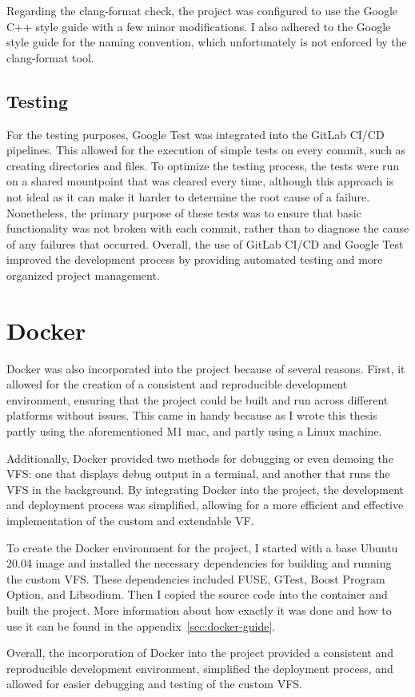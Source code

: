 Regarding the clang-format check, the project was configured to use the Google C++ style guide\cite{google_cpp_style_guide} with a few minor modifications.
I also adhered to the Google style guide for the naming convention, which unfortunately is not enforced by the clang-format tool.

\subsection{Testing}\label{subsec:testing}

For the testing purposes, Google Test was integrated into the GitLab CI/CD pipelines.
This allowed for the execution of simple tests on every commit, such as creating directories and files.
To optimize the testing process, the tests were run on a shared mountpoint that was cleared every time, although this approach is not ideal as it can make it harder to determine the root cause of a failure.
Nonetheless, the primary purpose of these tests was to ensure that basic functionality was not broken with each commit, rather than to diagnose the cause of any failures that occurred.
Overall, the use of GitLab CI/CD and Google Test improved the development process by providing automated testing and more organized project management.


\section{Docker}\label{sec:docker}

Docker\cite{docker} was also incorporated into the project because of several reasons.
First, it allowed for the creation of a consistent and reproducible development environment, ensuring that the project could be built and run across different platforms without issues.
This came in handy because as I wrote this thesis partly using the aforementioned M1 mac, and partly using a Linux machine.

Additionally, Docker provided two methods for debugging or even demoing the VFS: one that displays debug output in a terminal, and another that runs the VFS in the background.
By integrating Docker into the project, the development and deployment process was simplified, allowing for a more efficient and effective implementation of the custom and extendable VF\@.

To create the Docker environment for the project, I started with a base Ubuntu 20.04 image and installed the necessary dependencies for building and running the custom VFS\@.
These dependencies included FUSE, GTest, Boost Program Option, and Libsodium.
Then I copied the source code into the container and built the project.
More information about how exactly it was done and how to use it can be found in the appendix~\ref{sec:docker-guide}.

Overall, the incorporation of Docker into the project provided a consistent and reproducible development environment, simplified the deployment process, and allowed for easier debugging and testing of the custom VFS.